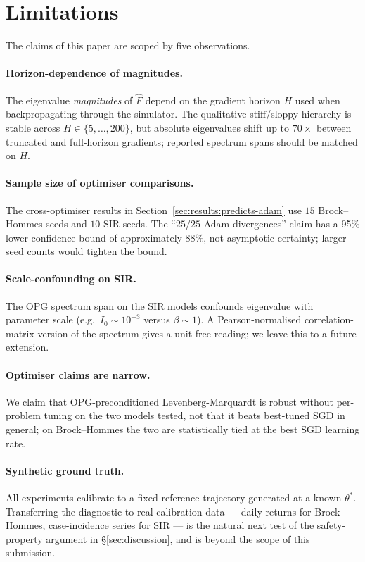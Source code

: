 \section{Limitations}
\label{sec:limitations}

The claims of this paper are scoped by five observations.

\paragraph{Horizon-dependence of magnitudes.}
The eigenvalue \emph{magnitudes} of $\widehat F$ depend on the gradient horizon $H$ used when backpropagating through the simulator. The qualitative stiff/sloppy hierarchy is stable across $H \in \{5, \ldots, 200\}$, but absolute eigenvalues shift up to $70\times$ between truncated and full-horizon gradients; reported spectrum spans should be matched on $H$.

\paragraph{Sample size of optimiser comparisons.}
The cross-optimiser results in Section~\ref{sec:results:predicts-adam} use $15$ Brock--Hommes seeds and $10$ SIR seeds. The ``$25/25$ Adam divergences'' claim has a 95\% lower confidence bound of approximately $88\%$, not asymptotic certainty; larger seed counts would tighten the bound.

\paragraph{Scale-confounding on SIR.}
The OPG spectrum span on the SIR models confounds eigenvalue with parameter scale (e.g.\ $I_0 \sim 10^{-3}$ versus $\beta \sim 1$). A Pearson-normalised correlation-matrix version of the spectrum gives a unit-free reading; we leave this to a future extension.

\paragraph{Optimiser claims are narrow.}
We claim that OPG-preconditioned Levenberg-Marquardt is robust without per-problem tuning on the two models tested, not that it beats best-tuned SGD in general; on Brock--Hommes the two are statistically tied at the best SGD learning rate.

\paragraph{Synthetic ground truth.}
All experiments calibrate to a fixed reference trajectory generated at a known $\theta^*$. Transferring the diagnostic to real calibration data --- daily returns for Brock--Hommes, case-incidence series for SIR --- is the natural next test of the safety-property argument in \S\ref{sec:discussion}, and is beyond the scope of this submission.
